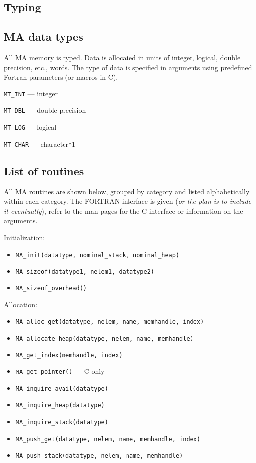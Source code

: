 \subsection{Typing}

\subsection{MA data types}

All MA memory is typed.  Data is allocated in units of integer,
logical, double precision, etc., words.  The type of data is specified
in arguments using predefined Fortran parameters (or macros in C).
\begin{description}
\item{\verb+MT_INT+} --- integer
\item{\verb+MT_DBL+} --- double precision
\item{\verb+MT_LOG+} --- logical
\item{\verb+MT_CHAR+} --- character\verb+*+1
\end{description}

\subsection{List of routines}

All MA routines are shown below, grouped by category and listed
alphabetically within each category.  The FORTRAN interface is given
({\em or the plan is to include it eventually}),
refer to the man pages for the C interface or information on the
arguments.

Initialization: 
\begin{itemize}
\item {\tt MA\_init(datatype, nominal\_stack, nominal\_heap)}
\item {\tt MA\_sizeof(datatype1, nelem1, datatype2)}
\item {\tt MA\_sizeof\_overhead()}
\end{itemize}

Allocation:
\begin{itemize}
\item {\tt MA\_alloc\_get(datatype, nelem, name, memhandle, index)}
\item {\tt MA\_allocate\_heap(datatype, nelem, name, memhandle)}
\item {\tt MA\_get\_index(memhandle, index)}
\item {\tt MA\_get\_pointer()} --- C only
\item {\tt MA\_inquire\_avail(datatype)}
\item {\tt MA\_inquire\_heap(datatype)}
\item {\tt MA\_inquire\_stack(datatype)}
\item {\tt MA\_push\_get(datatype, nelem, name, memhandle, index)}
\item {\tt MA\_push\_stack(datatype, nelem, name, memhandle)}
\end{itemize}

